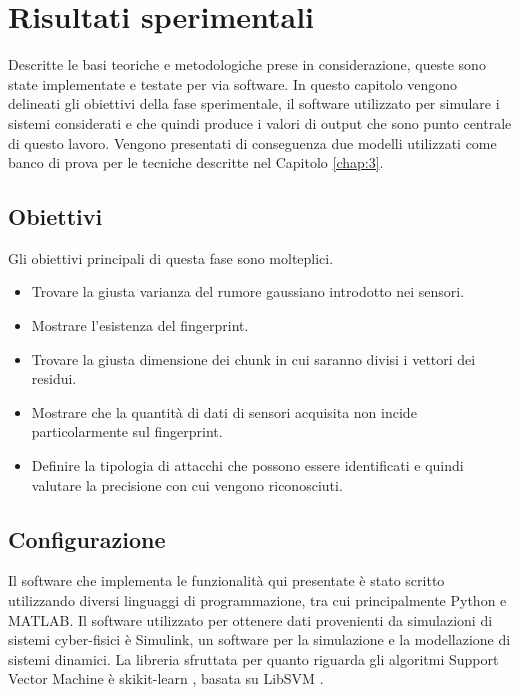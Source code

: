 \documentclass[Lau,binding=0.6cm]{sapthesis}
\begin{document}
\chapter{Risultati sperimentali}\label{chap:5}
Descritte le basi teoriche e metodologiche prese in considerazione, queste sono state implementate e testate per via software.
In questo capitolo vengono delineati gli obiettivi della fase sperimentale, il software utilizzato per simulare i sistemi considerati e che quindi produce i valori di output 
che sono punto centrale di questo lavoro. Vengono presentati di conseguenza due modelli utilizzati come banco di prova per le tecniche descritte nel Capitolo \ref{chap:3}.

\section{Obiettivi}\label{sec:1}
Gli obiettivi principali di questa fase sono molteplici.
\begin{itemize}
    \item Trovare la giusta varianza del rumore gaussiano introdotto nei sensori.
    \item Mostrare l'esistenza del fingerprint.
    \item Trovare la giusta dimensione dei chunk in cui saranno divisi i vettori dei residui.
    \item Mostrare che la quantit\`a di dati di sensori acquisita non incide particolarmente sul fingerprint.
    \item Definire la tipologia di attacchi che possono essere identificati e quindi valutare la precisione con cui vengono riconosciuti.
 \end{itemize}

\section{Configurazione}
Il software che implementa le funzionalit\`a qui presentate \`e stato scritto utilizzando diversi linguaggi di programmazione, tra cui principalmente Python e MATLAB.
Il software utilizzato per ottenere dati provenienti da simulazioni di sistemi cyber-fisici \`e Simulink, un software per la simulazione e la modellazione di sistemi dinamici.
La libreria sfruttata per quanto riguarda gli algoritmi Support Vector Machine \`e skikit-learn \cite{pedregosa2011scikit}, basata su LibSVM \cite{chang2011libsvm}.
\end{document}
